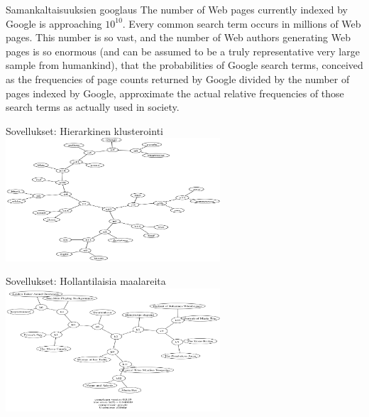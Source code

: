 \documentclass{beamer}
\begin{document}
\begin{frame}{Samankaltaisuuksien googlaus}
  The number of Web pages currently indexed by Google is approaching $10^10$. Every common search term occurs in millions of Web pages. This number is so vast, and the number of Web authors generating Web pages is so enormous (and can be assumed to be a truly representative very large sample from humankind), that the probabilities of Google search terms, conceived as the frequencies of page counts returned by Google divided by the number of pages indexed by Google, approximate the actual relative frequencies of those search terms as actually used in society.
\end{frame}


\begin{frame}{Sovellukset: Hierarkinen klusterointi}
  \centering
  \includegraphics[width=8cm,keepaspectratio=true]{google-000}
\end{frame}

\begin{frame}{Sovellukset: Hollantilaisia maalareita}
  \centering
  \includegraphics[width=8cm,keepaspectratio=true]{google-001}
\end{frame}
\end{document}
